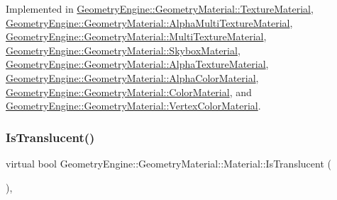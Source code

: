 Implemented in \mbox{\hyperlink{class_geometry_engine_1_1_geometry_material_1_1_texture_material_a7bb3c956fa64e47b251d882890c931f9}{Geometry\+Engine\+::\+Geometry\+Material\+::\+Texture\+Material}}, \mbox{\hyperlink{class_geometry_engine_1_1_geometry_material_1_1_alpha_multi_texture_material_a1ccf4b07be9fe240d521345eb5312a79}{Geometry\+Engine\+::\+Geometry\+Material\+::\+Alpha\+Multi\+Texture\+Material}}, \mbox{\hyperlink{class_geometry_engine_1_1_geometry_material_1_1_multi_texture_material_af6edaa5960d07b6abee870760e869189}{Geometry\+Engine\+::\+Geometry\+Material\+::\+Multi\+Texture\+Material}}, \mbox{\hyperlink{class_geometry_engine_1_1_geometry_material_1_1_skybox_material_a0cc520b905996a178c80a2657bc9746f}{Geometry\+Engine\+::\+Geometry\+Material\+::\+Skybox\+Material}}, \mbox{\hyperlink{class_geometry_engine_1_1_geometry_material_1_1_alpha_texture_material_a4080f2353ed87dc47589ac5568f48c43}{Geometry\+Engine\+::\+Geometry\+Material\+::\+Alpha\+Texture\+Material}}, \mbox{\hyperlink{class_geometry_engine_1_1_geometry_material_1_1_alpha_color_material_a2c0f093001db90b50e42b0520c48f7d1}{Geometry\+Engine\+::\+Geometry\+Material\+::\+Alpha\+Color\+Material}}, \mbox{\hyperlink{class_geometry_engine_1_1_geometry_material_1_1_color_material_abaf6f7ed79dad79253ea469c4c7460eb}{Geometry\+Engine\+::\+Geometry\+Material\+::\+Color\+Material}}, and \mbox{\hyperlink{class_geometry_engine_1_1_geometry_material_1_1_vertex_color_material_af03191da84c84c45af91405f3cba3b5d}{Geometry\+Engine\+::\+Geometry\+Material\+::\+Vertex\+Color\+Material}}.

\mbox{\label{class_geometry_engine_1_1_geometry_material_1_1_material_ab8c9af9c6cbd2b4a8ad64f3a80702402}} 
\subsubsection{\texorpdfstring{IsTranslucent()}{IsTranslucent()}}
{\footnotesize\ttfamily virtual bool Geometry\+Engine\+::\+Geometry\+Material\+::\+Material\+::\+Is\+Translucent (\begin{DoxyParamCaption}{ }\end{DoxyParamCaption})\hspace{0.3cm}{\ttfamily [inline]}, {\ttfamily [virtual]}}

